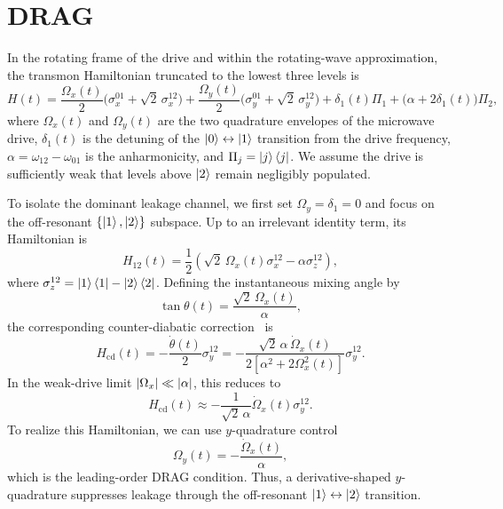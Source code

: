 \section*{DRAG}
In the rotating frame of the drive and within the rotating-wave approximation, the transmon Hamiltonian truncated to the lowest three levels is
\begin{equation}
\label{eq:H_drag_start}
H(t)=
\frac{\Omega_x(t)}{2}\bigl(\sigma_x^{01}+\sqrt{2}\,\sigma_x^{12}\bigr)
+
\frac{\Omega_y(t)}{2}\bigl(\sigma_y^{01}+\sqrt{2}\,\sigma_y^{12}\bigr)
+
\delta_1(t)\Pi_1
+
\bigl(\alpha+2\delta_1(t)\bigr)\Pi_2,
\end{equation}
where \(\Omega_x(t)\) and \(\Omega_y(t)\) are the two quadrature envelopes of the microwave drive, \(\delta_1(t)\) is the detuning of the \(\ket{0}\leftrightarrow\ket{1}\) transition from the drive frequency, \(\alpha=\omega_{12}-\omega_{01}\) is the anharmonicity, and \(\Pi_j=\ket{j}\bra{j}\). We assume the drive is sufficiently weak that levels above \(\ket{2}\) remain negligibly populated.

To isolate the dominant leakage channel, we first set \(\Omega_y=\delta_1=0\) and focus on the off-resonant \(\{\ket{1},\ket{2}\}\) subspace. Up to an irrelevant identity term, its Hamiltonian is
\begin{equation}
\label{eq:H12_drag}
H_{12}(t)=\frac{1}{2}\left(\sqrt{2}\,\Omega_x(t)\sigma_x^{12}-\alpha \sigma_z^{12}\right),
\end{equation}
where \(\sigma_z^{12}=\ket{1}\bra{1}-\ket{2}\bra{2}\). Defining the instantaneous mixing angle by
\begin{equation}
\label{eq:theta_drag}
\tan\theta(t)=\frac{\sqrt{2}\,\Omega_x(t)}{\alpha},
\end{equation}
the corresponding counter-diabatic correction~\cite{Berry2009,GueryOdelin2019} is
\begin{equation}
\label{eq:Hcd_drag}
H_{\mathrm{cd}}(t)
=
-\frac{\dot{\theta}(t)}{2}\sigma_y^{12}
=
-\frac{\sqrt{2}\,\alpha\,\dot{\Omega}_x(t)}
{2\left[\alpha^2+2\Omega_x^2(t)\right]}\sigma_y^{12}.
\end{equation}
In the weak-drive limit \(\abs{\Omega_x}\ll \abs{\alpha}\), this reduces to
\begin{equation}
\label{eq:Hcd_drag_weak}
H_{\mathrm{cd}}(t)\approx -\frac{1}{\sqrt{2}\,\alpha}\dot{\Omega}_x(t)\sigma_y^{12}.
\end{equation}
To realize this Hamiltonian, we can use \(y\)-quadrature control
\begin{equation}
\label{eq:drag_y_only}
\Omega_y(t)=-\frac{\dot{\Omega}_x(t)}{\alpha},
\end{equation}
which is the leading-order DRAG condition.
Thus, a derivative-shaped \(y\)-quadrature suppresses leakage through the off-resonant \(\ket{1}\leftrightarrow\ket{2}\) transition.

